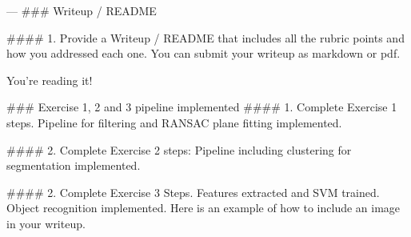 \documentclass{article}
\begin{document}









---
### Writeup / README

#### 1. Provide a Writeup / README that includes all the rubric points and how you addressed each one.  You can submit your writeup as markdown or pdf.  

You're reading it!

### Exercise 1, 2 and 3 pipeline implemented
#### 1. Complete Exercise 1 steps. Pipeline for filtering and RANSAC plane fitting implemented.

#### 2. Complete Exercise 2 steps: Pipeline including clustering for segmentation implemented.  

#### 2. Complete Exercise 3 Steps.  Features extracted and SVM trained.  Object recognition implemented.
Here is an example of how to include an image in your writeup.
\end{document}
